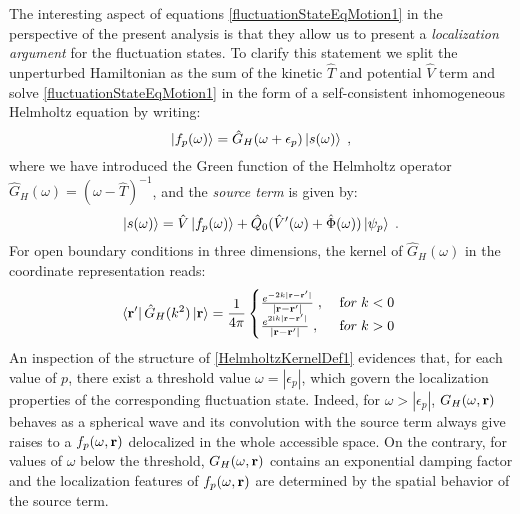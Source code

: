 \documentclass[reprint,aps,prb]{revtex4-1}
\renewcommand{\r}{{\bf r}}
\newcommand{\eps}{\epsilon}
\newcommand{\ii}{\mathrm{i}}
\newcommand{\be}{\begin{equation}}
\newcommand{\ee}{\end{equation}}
\newcommand{\nn}{\notag}
\newcommand{\lb}{\label}
\newcommand{\op}[1]{\hat {#1}}
\newcommand{\brket}[2]{\langle  #1 | #2 \rangle} %
\begin{document}
The interesting aspect of equations \eqref{fluctuationStateEqMotion1} in the perspective of the present analysis is that they allow us to present a 
\emph{localization argument} for the fluctuation states. To clarify this statement we split the unperturbed Hamiltonian as the sum of the kinetic $\op T$ and potential 
$\op V$ term and solve \eqref{fluctuationStateEqMotion1} in the form of a self-consistent inhomogeneous Helmholtz equation by writing:
\be
\ket{f_p(\omega)} = \op G_H(\omega+\epsilon_p)\ket{s(\omega)} \;,
\ee
where we have introduced the Green function of the Helmholtz operator $\op G_H(\omega) = (\omega-\op T)^{-1}$, %
and the \emph{source term} is given by:
\be
\ket{s(\omega)} =  \op V\ket{f_p(\omega)} + \op Q_0(\op V'(\omega) + \op \Phi(\omega))\ket{\psi_p} \;.\nn
\ee
For open boundary conditions in three dimensions, the kernel of $\op G_H(\omega)$ in the coordinate representation reads: 
\be\lb{HelmholtzKernelDef1}
\bra{\r'} \op G_H(k^2) \ket\r = \frac{1}{4\pi} \begin{cases}
\frac{e^{-2k|\r - \r' |}}{|\r- \r' |} \;,\; & {\textrm for}\; k < 0\; \\ 
\frac{e^{2\ii k |\r-\r' |}}{|\r-\r' |} \;, & {\textrm for} \; k > 0
\end{cases}
\ee
An inspection of the structure of \eqref{HelmholtzKernelDef1} evidences that, for each value of $p$, there exist a threshold value $\omega = |\eps_p|$, 
which govern the localization properties of the corresponding fluctuation state. Indeed, for $\omega > |\eps_p|$,  $G_H(\omega,\r)$ behaves as a spherical wave and its
convolution with the source term always give raises to a $f_p(\omega,\r)$ delocalized in the whole accessible space. On the contrary, for values of $\omega$ below the threshold,
$G_H(\omega,\r)$ contains an exponential damping factor and the localization features of $f_p(\omega,\r)$ are determined by the spatial behavior of the source term.  
\end{document}
